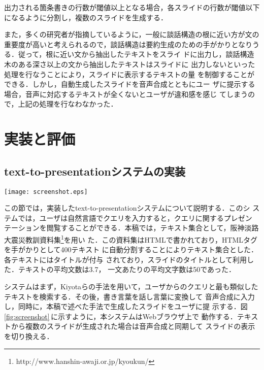 出力される箇条書きの行数が閾値以上となる場合，各スライドの行数が閾値以下
になるように分割し，複数のスライドを生成する．

また，多くの研究者が指摘しているように，一般に談話構造の根に近い方が文の
重要度が高いと考えられるので，談話構造は要約生成のための手がかりとなりう
る\cite{Ono94,Marcu99a}．従って，根に近い文から抽出したテキストをスライ
ドに出力し，談話構造木のある深さ以上の文から抽出したテキストはスライドに
出力しないといった処理を行なうことにより，スライドに表示するテキストの量
を制御することができる．しかし，自動生成したスライドを音声合成とともにユー
ザに提示する場合，音声に対応するテキストが全くないとユーザが違和感を感じ
てしまうので，上記の処理を行なわなかった．

\section{実装と評価}
\label{sec:evaluation}


\subsection{text-to-presentationシステムの実装}

\begin{figure*}[t]
 \begin{center}
     \texttt{[image: screenshot.eps]}
\caption{システムのスクリーンショット}
\label{fig:screenshot}
 \end{center} 
\end{figure*}


この節では，実装したtext-to-presentationシステムについて説明する．このシ
ステムでは，ユーザは自然言語でクエリを入力すると，クエリに関するプレゼン
テーションを閲覧することができる．本稿では，テキスト集合として，阪神淡路
大震災教訓資料集\footnote{http://www.hanshin-awaji.or.jp/kyoukun/}を用い
た．この資料集はHTMLで書かれており，HTMLタグを手がかりとして400テキスト
に自動分割することによりテキスト集合とした．各テキストにはタイトルが付与
されており，スライドのタイトルとして利用した．テキストの平均文数は3.7，
一文あたりの平均文字数は50であった．

システムはまず，Kiyotaらの手法を用いて，ユーザからのクエリと最も類似した
テキストを検索する\cite{Kiyota02}．その後，書き言葉を話し言葉に変換して
音声合成に入力し，同時に，本稿で述べた手法で生成したスライドをユーザに提
示する．図\ref{fig:screenshot}\,に示すように，本システムはWebブラウザ上で
動作する．テキストから複数のスライドが生成された場合は音声合成と同期して
スライドの表示を切り換える．

